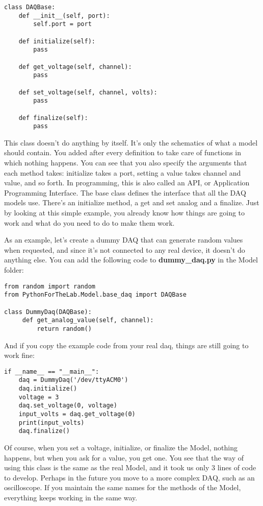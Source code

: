 \begin{verbatim}
class DAQBase:
    def __init__(self, port):
        self.port = port

    def initialize(self):
        pass

    def get_voltage(self, channel):
        pass

    def set_voltage(self, channel, volts):
        pass

    def finalize(self):
        pass
\end{verbatim}

This class doesn't do anything by itself. It's only the schematics of what a model should contain. You added  after every definition to take care of functions in which nothing happens. You can see that you also specify the arguments that each method takes: initialize takes a port, setting a value takes channel and value, and so forth. In programming, this is also called an API, or Application Programming Interface. The base class defines the interface that all the DAQ models use. There's an initialize method, a get and set analog and a finalize. Just by looking at this simple example, you already know how things are going to work and what do you need to do to make them work.

As an example, let's create a dummy DAQ that can generate random values when requested, and since it's not connected to any real device, it doesn't do anything else. You can add the following code to \textbf{dummy\_daq.py} in the Model folder:

\begin{verbatim}
from random import random
from PythonForTheLab.Model.base_daq import DAQBase

class DummyDaq(DAQBase):
     def get_analog_value(self, channel):
         return random()
\end{verbatim}

And if you copy the example code from your real daq, things are still going to work fine:

\begin{verbatim}
if __name__ == "__main__":
    daq = DummyDaq('/dev/ttyACM0')
    daq.initialize()
    voltage = 3
    daq.set_voltage(0, voltage)
    input_volts = daq.get_voltage(0)
    print(input_volts)
    daq.finalize()
\end{verbatim}

Of course, when you set a voltage, initialize, or finalize the Model, nothing happens, but when you ask for a value, you get one. You see that the way of using this class is the same as the real Model, and it took us only 3 lines of code to develop. Perhaps in the future you move to a more complex DAQ, such as an oscilloscope. If you maintain the same names for the methods of the Model, everything keeps working in the same way.

